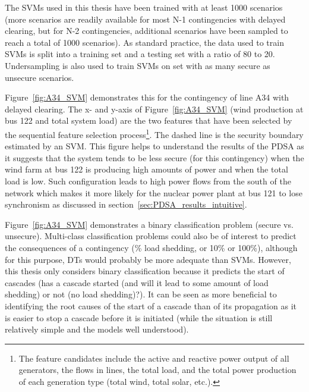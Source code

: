 The SVMs used in this thesis have been trained with at least 1000 scenarios (more scenarios are readily available for most N-1 contingencies with delayed clearing, but for N-2 contingencies, additional scenarios have been sampled to reach a total of 1000 scenarios). As standard practice, the data used to train SVMs is split into a training set and a testing set with a ratio of 80 to 20. Undersampling is also used to train SVMs on set with as many secure as unsecure scenarios.

Figure~\ref{fig:A34_SVM} demonstrates this for the contingency of line A34 with delayed clearing. The x- and y-axis of Figure~\ref{fig:A34_SVM} (wind production at bus 122 and total system load) are the two features that have been selected by the sequential feature selection process\footnote{The feature candidates include the active and reactive power output of all generators, the flows in lines, the total load, and the total power production of each generation type (total wind, total solar, etc.).}. The dashed line is the security boundary estimated by an SVM. This figure helps to understand the results of the PDSA as it suggests that the system tends to be less secure (for this contingency) when the wind farm at bus 122 is producing high amounts of power and when the total load is low. Such configuration leads to high power flows from the south of the network which makes it more likely for the nuclear power plant at bus 121 to lose synchronism as discussed in section~\ref{sec:PDSA_results_intuitive}.

Figure~\ref{fig:A34_SVM} demonstrates a binary classification problem (secure vs. unsecure). Multi-class classification problems could also be of interest to predict the consequences of a contingency (\% load shedding, or 10\% or 100\%), although for this purpose, DTs would probably be more adequate than SVMs. However, this thesis only considers binary classification because it predicts the start of cascades (\ie has a cascade started (and will it lead to some amount of load shedding) or not (no load shedding)?). It can be seen as more beneficial to identifying the root causes of the start of a cascade than of its propagation as it is easier to stop a cascade before it is initiated (while the situation is still relatively simple and the models well understood).


